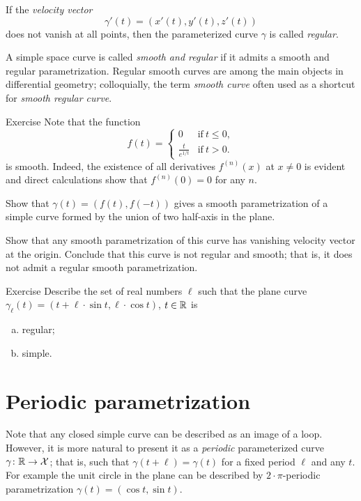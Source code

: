 If the \emph{velocity vector} 
\[\gamma'(t)=(x'(t),y'(t),z'(t))\] 
does not vanish at all points, then the parameterized curve $\gamma$ is called \emph{regular}.

A simple space curve is called \emph{smooth and regular} if it admits a smooth and regular parametrization.
Regular smooth curves are among the main objects in differential geometry;
colloquially, the term \emph{smooth curve} often used as a shortcut for \emph{smooth regular curve}. 

\begin{thm}{Exercise}\label{ex:L-shape}
Note that the function 
\[f(t)=
\begin{cases}
0&\text{if}\ t\le 0,
\\
\frac{t}{e^{1\!/\!t}}&\text{if}\ t> 0.
\end{cases}
\]
is smooth. Indeed, the existence of all derivatives $f^{(n)}(x)$ at $x\ne 0$ is evident and direct calculations show that $f^{(n)}(0)=0$ for any $n$.

Show that $\gamma(t)=(f(t),f(-t))$ gives a smooth parametrization of a simple curve formed by the union of two half-axis in the plane.

Show that any smooth parametrization of this curve has vanishing velocity vector at the origin.
Conclude that this curve is not regular and smooth;
that is, it does not admit a regular smooth parametrization.
\end{thm}


\begin{thm}{Exercise}\label{ex:cycloid}
Describe the set of real numbers $\ell $
such that the plane curve $\gamma_\ell (t)= (t+\ell \cdot \sin t,\ell \cdot \cos t)$, $t\in\mathbb{R}$ is
\begin{enumerate}[(a)]
\item regular;
\item simple.
\end{enumerate}

\end{thm}

\section*{Periodic parametrization}
Note that any closed simple curve can be described as an image of a loop.
However, it is more natural to present it as a \emph{periodic} parameterized curve $\gamma\colon \mathbb{R}\to \mathcal{X}$; that is, such that $\gamma(t+\ell)=\gamma(t)$ for a fixed period $\ell$ and any $t$.
For example the unit circle in the plane can be described by $2{\cdot}\pi$-periodic parametrization $\gamma(t)=(\cos t,\sin t)$.

